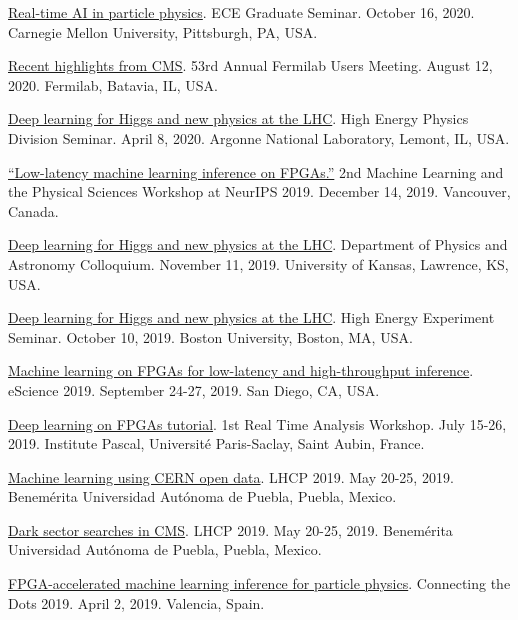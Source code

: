\documentclass[11pt]{res}
\begin{document}
\begin{resume}
  \href{https://www.cs.cmu.edu/calendar/fri-2020-10-16-1200/ece-graduate-seminar}{Real-time AI in particle physics}. ECE Graduate Seminar. October 16, 2020. Carnegie Mellon University, Pittsburgh, PA, USA.

  \href{https://indico.fnal.gov/event/23109/contributions/193292/}{Recent highlights from CMS}. 53rd Annual Fermilab Users Meeting. August 12, 2020. Fermilab, Batavia, IL, USA.

  \href{https://indico.fnal.gov/event/22961/}{Deep learning for Higgs and new physics at the LHC}. High Energy Physics Division Seminar. April 8, 2020. Argonne National Laboratory, Lemont, IL, USA.

  \href{https://ml4physicalsciences.github.io/2019/files/NeurIPS_ML4PS_2019_74.pdf}{``Low-latency machine learning inference on FPGAs.''} 2nd Machine Learning and the Physical Sciences Workshop at NeurIPS 2019.  December 14, 2019. Vancouver, Canada.

  \href{https://physics.drupal.ku.edu/calendar/colloquia#/?i=2}{Deep learning for Higgs and new physics at the LHC}. Department of Physics and Astronomy Colloquium. November 11, 2019. University of Kansas, Lawrence, KS, USA.

  \href{http://physics.bu.edu/events/show/2204}{Deep learning for Higgs and new physics at the LHC}. High Energy Experiment Seminar. October 10, 2019. Boston University, Boston, MA, USA.

  \href{https://escience2019.sdsc.edu/program}{Machine learning on FPGAs for low-latency and high-throughput inference}. eScience 2019. September 24-27, 2019. San Diego, CA, USA.

  \href{https://indico.cern.ch/event/793125/contributions/3495251/}{Deep learning on FPGAs tutorial}. 1st Real Time Analysis Workshop. July 15-26, 2019. Institute Pascal, Universit\'{e} Paris-Saclay, Saint Aubin, France.

  \href{https://indico.cern.ch/event/687651/contributions/3428206/}{Machine learning using CERN open data}. LHCP 2019. May 20-25, 2019. Benem\'{e}rita Universidad Aut\'{o}noma de Puebla, Puebla, Mexico.

  \href{https://indico.cern.ch/event/687651/contributions/3426898/}{Dark sector searches in CMS}. LHCP 2019. May 20-25, 2019. Benem\'{e}rita Universidad Aut\'{o}noma de Puebla, Puebla, Mexico.

  \href{https://indico.cern.ch/event/742793/contributions/3274392/}{FPGA-accelerated machine learning inference for particle physics}. Connecting the Dots 2019. April 2, 2019. Valencia, Spain.


\end{resume}
\end{document}
